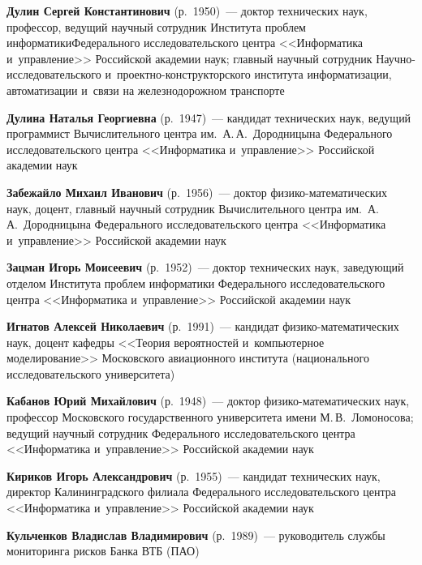 \begin{multicols}{2}
\noindent
\textbf{Дулин Сергей Константинович} (р.\ 1950)~--- 
доктор технических наук, профессор, ведущий научный сотрудник Института проб\-лем информатики\linebreak Федерального исследовательского цент\-ра 
<<Информатика и~управ\-ле\-ние>> Российской академии наук; главный научный сотрудник На\-уч\-но-ис\-сле\-до\-ва\-тель\-ско\-го 
и~про\-ект\-но-конст\-рук\-тор\-ско\-го \mbox{института} информатизации, автоматизации и~связи на железнодорожном транспорте

\noindent
\textbf{Дулина Наталья Георгиевна} (р.\ 1947)~--- 
кандидат технических наук, ведущий программист Вы\-чис\-ли\-тель\-но\-го центра им.\ А.\,А.~Дородницына Федерального исследовательского цент\-ра 
<<Информатика и~управ\-ле\-ние>> Российской академии наук

\noindent
\textbf{Забежайло Михаил Иванович} (р.\ 1956)~--- доктор фи\-зи\-ко-ма\-те\-ма\-ти\-че\-ских наук, 
доцент, главный научный со\-труд\-ник Вы\-чис\-ли\-тель\-но\-го цент\-ра им.\ А.\,А.~Дородницына 
Федерального исследовательского цент\-ра <<Информатика и~управ\-ле\-ние>> Российской академии наук

\noindent
\textbf{Зацман Игорь Моисеевич} (р.\ 1952)~--- 
доктор технических наук, за\-ве\-ду\-ющий отделом Института проб\-лем информатики Федерального исследовательского цент\-ра 
<<Информатика и~управ\-ле\-ние>> \mbox{Российской} академии наук

\noindent
\textbf{Игнатов Алексей Николаевич} (р.\ 1991)~--- кандидат фи\-зи\-ко-ма\-те\-ма\-ти\-че\-ских наук, 
доцент ка\-фед\-ры <<Тео\-рия вероятностей и~компьютерное моделирование>> Мос\-ков\-ско\-го 
авиационного института (национального исследовательского университета)

\noindent
\textbf{Кабанов Юрий Михайлович} (р.\ 1948)~--- доктор фи\-зи\-ко-ма\-те\-ма\-ти\-че\-ских наук, 
профессор Московского государственного университета имени М.\,В.~Ломоносова;  
ведущий научный со\-труд\-ник Федерального исследовательского цент\-ра <<Информатика и~управ\-ле\-ние>>
 Российской академии наук

\noindent
\textbf{Кириков Игорь Александрович} (р.\ 1955)~--- 
кандидат технических наук, директор Калининградского филиала Федерального исследовательского цент\-ра <<Информатика и~управ\-ле\-ние>>
 Российской академии наук
 
\pagebreak
 
 \noindent
 \textbf{Кульченков Владислав Владимирович} (р.\ 1989)~--- руководитель служ\-бы мониторинга рис\-ков Банка ВТБ (ПАО)
 

\end{multicols}
